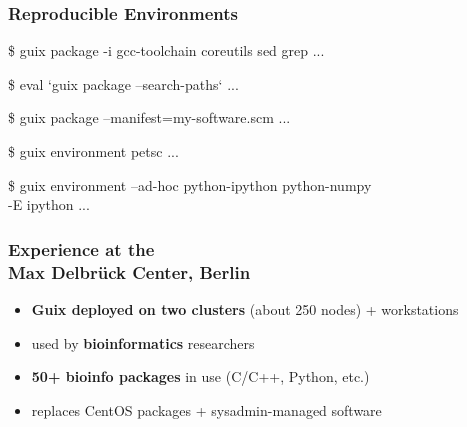 \documentclass{beamer}
\begin{document}
\begin{frame}[fragile]
  \frametitle{Reproducible Environments}

  \begin{semiverbatim}
\$ guix package -i gcc-toolchain coreutils sed grep
\textrm{...}

\$ eval `guix package --search-paths`
\textrm{...}

\$ guix package --manifest=my-software.scm
\textrm{...}

\$ guix environment petsc
\textrm{...}

\$ guix environment --ad-hoc python-ipython python-numpy \\
    -E ipython
\textrm{...}
  \end{semiverbatim}

\end{frame}

\begin{frame}
  \frametitle{Experience at the\\Max Delbrück Center, Berlin}

  \large{
  \begin{itemize}
    \item \textbf{Guix deployed on two clusters} (about 250 nodes) + workstations
    \item used by \textbf{bioinformatics} researchers
    \item \textbf{50+ bioinfo packages} in use (C/C++, Python,
      etc.)
    \item replaces CentOS packages + sysadmin-managed software
  \end{itemize}
  }
\end{frame}

\end{document}
